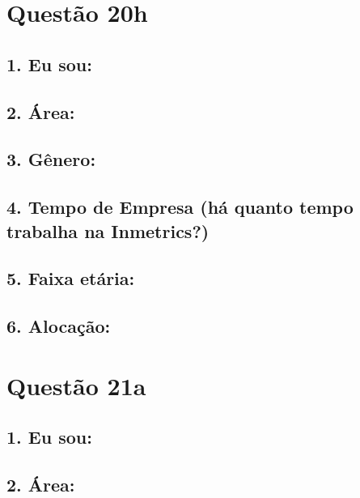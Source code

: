 \documentclass[]{book}
\begin{document}
\hypertarget{questao-20h}{%
\section{Questão 20h}\label{questao-20h}}

\hypertarget{eu-sou-60}{%
\subsection{1. Eu sou:}\label{eu-sou-60}}

\hypertarget{area-60}{%
\subsection{2. Área:}\label{area-60}}

\hypertarget{genero-60}{%
\subsection{3. Gênero:}\label{genero-60}}

\hypertarget{tempo-de-empresa-ha-quanto-tempo-trabalha-na-inmetrics-60}{%
\subsection{4. Tempo de Empresa (há quanto tempo trabalha na Inmetrics?)}\label{tempo-de-empresa-ha-quanto-tempo-trabalha-na-inmetrics-60}}

\hypertarget{faixa-etaria-60}{%
\subsection{5. Faixa etária:}\label{faixa-etaria-60}}

\hypertarget{alocacao-60}{%
\subsection{6. Alocação:}\label{alocacao-60}}

\hypertarget{questao-21a}{%
\section{Questão 21a}\label{questao-21a}}

\hypertarget{eu-sou-61}{%
\subsection{1. Eu sou:}\label{eu-sou-61}}

\hypertarget{area-61}{%
\subsection{2. Área:}\label{area-61}}
\end{document}
